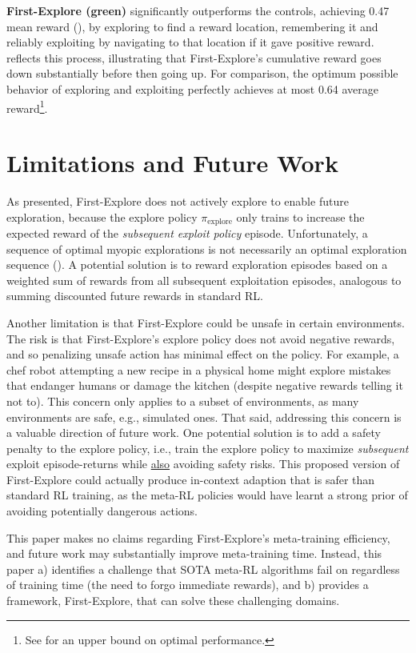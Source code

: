 \documentclass{article}
\begin{document}
\textbf{\textcolor{fe}{First-Explore (green)}} significantly outperforms the controls, achieving 0.47 mean reward (), by exploring to find a reward location, remembering it and reliably exploiting by navigating to that location if it gave positive reward.  reflects this process, illustrating that First-Explore's cumulative reward goes down substantially before then going up. For comparison, the optimum possible behavior of exploring and exploiting perfectly achieves at most 0.64 average reward\footnote{See  for an upper bound on optimal performance.}.
\FloatBarrier

\section{Limitations and Future Work} \label{limitations}

As presented, First-Explore does not actively explore to enable future exploration, because the explore policy \(\pi_{\text{explore}}\) only trains to increase the expected reward of the \emph{subsequent exploit policy} episode. Unfortunately, a sequence of optimal myopic explorations is not necessarily an optimal exploration sequence (). A potential solution is to reward exploration episodes based on a weighted sum of rewards from all subsequent exploitation episodes, analogous to summing discounted future rewards in standard RL.

Another limitation is that First-Explore could be unsafe in certain environments. The risk is that First-Explore's explore policy does not avoid negative rewards,
%
and so penalizing unsafe action has minimal effect on the policy. For example, a chef robot attempting a new recipe in a physical home might explore mistakes that endanger humans or damage the kitchen (despite negative rewards telling it not to). This concern only applies to a subset of environments, as many environments are safe, e.g., simulated ones. That said, addressing this concern is a valuable direction of future work.
%
One potential solution is to add a safety penalty to the explore policy, i.e., train the explore policy to maximize \emph{subsequent} exploit episode-returns while \underline{also} avoiding safety risks. This proposed version of First-Explore could actually produce in-context adaption that is safer than standard RL training, as the meta-RL policies would have learnt a strong prior of avoiding potentially dangerous actions.

This paper makes no claims regarding First-Explore’s meta-training efficiency, and future work may substantially improve meta-training time. Instead, this paper a) identifies a challenge that SOTA meta-RL algorithms fail on regardless of training time (the need to forgo immediate rewards), and b) provides a framework, First-Explore, that can solve these challenging domains.
\end{document}
